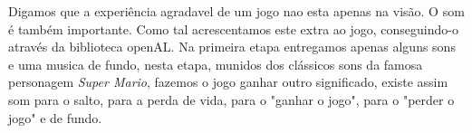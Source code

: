 Digamos que a experiência agradavel de um jogo nao esta apenas na visão. O som é também importante. Como tal acrescentamos este extra ao jogo, conseguindo-o através da biblioteca openAL. Na primeira etapa entregamos apenas alguns sons e uma musica  de fundo, nesta etapa, munidos dos clássicos sons da famosa personagem \textit{Super Mario}, fazemos o jogo ganhar outro significado, existe assim som para o salto, para a perda de vida, para o "ganhar o jogo", para o "perder o jogo" e de fundo.
